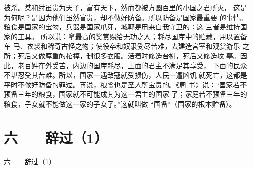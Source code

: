 \documentclass[12pt,UTF8]{ctexbook}
\begin{document}
被杀。桀和纣虽贵为天子，富有天下，然而都被方圆百里的小国之君所灭， 
这是为何呢？是因为他们虽然富贵，却不做好防备。所以防备是国家最重要 
的事情。粮食是国家的宝物，兵器是国家爪牙，城郭是用来自我守卫的：这 
三者是维持国家的工具。 
所以说：拿最高的奖赏赐给无功之人；耗尽国库中的贮藏，用以置备车 
马、衣裘和稀奇古怪之物；使役卒和奴隶受尽苦难，去建造宫室和观赏游乐 
之所；死后又做厚重的棺椁，制很多衣服。活着时修造台榭，死后又修造坟 
墓。因此，老百姓在外受苦，内边的国库耗尽，上面的君主不满足其享受， 
下面的民众不堪忍受其苦难。所以，国家一遇敌寇就受损伤，人民一遭凶饥 
就死亡，这都是平时不做好防备的罪过。再说，粮食也是圣人所宝贵的。《周 
书》说：“国家若不预备三年的粮食，国家就不可能成其为这一君主的国家 
了；家庭若不预备三年的粮食，子女就不能做这一家的子女了。”这就叫做 
“国备”（国家的根本贮备）。 

\chapter{六　　辞过（1）}
六　　辞过（1）
\end{document}
